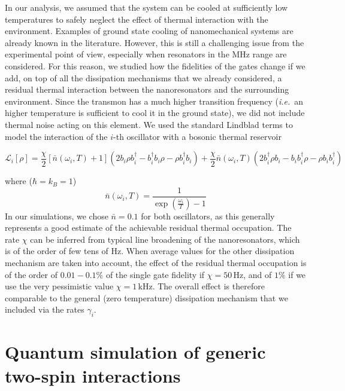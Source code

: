 \documentclass[aps,twocolumn,groupedaddress,superscriptaddress,floatfix,amsmath,amssymb,prb]{revtex4-1}
\begin{document}
In our analysis, we assumed that the system can be cooled at sufficiently low temperatures to safely neglect the effect of thermal interaction with the environment. Examples of ground state cooling of nanomechanical systems are already known in the literature. However, this is still a challenging issue from the experimental point of view, especially when resonators in the MHz range are considered. For this reason, we studied how the fidelities of the gates change if we add, on top of all the dissipation mechanisms that we already considered, a residual thermal interaction between the nanoresonators and the surrounding environment. Since the transmon has a much higher transition frequency (\textit{i.e.}\ an higher temperature is sufficient to cool it in the ground state), we did not include thermal noise acting on this element. We used the standard Lindblad terms to model the interaction of the $i$-th oscillator with a bosonic thermal reservoir
\begin{widetext}
\begin{equation}
\mathcal{L}_i [\rho] = \frac{\chi}{2}\left[\bar{n}\left(\omega_i,T\right)+1\right]\left(2b_i\rho b_i^\dagger - b_i^\dagger b_i\rho - \rho b_i^\dagger b_i\right) + \frac{\chi}{2}\bar{n}(\omega_i,T)\left(2b_i^\dagger\rho b_i - b_i b_i^\dagger\rho - \rho b_i b_i^\dagger\right) 
\end{equation}
\end{widetext}
where ($\hbar = k_B = 1$)
\begin{equation}
\bar{n}(\omega_i, T) = \frac{1}{\exp\left(\frac{\omega_i}{T}\right)-1}
\end{equation}
In our simulations, we chose $\bar{n} = 0.1$ for both oscillators, as this generally represents a good estimate of the achievable residual thermal occupation. The rate $\chi$ can be inferred from typical line broadening of the nanoresonators, which is of the order of few tens of Hz. When average values for the other dissipation mechanism are taken into account, the effect of the residual thermal occupation is of the order of $0.01-0.1\%$ of the single gate fidelity if $\chi = 50\,$Hz, and of $1\%$ if we use the very pessimistic value $\chi = 1\,$kHz. The overall effect is therefore comparable to the general (zero temperature) dissipation mechanism that we included via the rates $\gamma_i$.


\section{Quantum simulation of generic two-spin interactions}
\label{app:Simulation}
\end{document}

